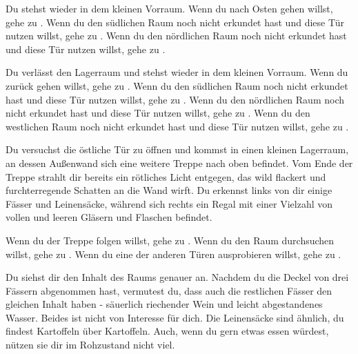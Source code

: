 
Du stehst wieder in dem kleinen Vorraum. Wenn du nach Osten gehen willst, gehe zu .
Wenn du den südlichen Raum noch nicht erkundet hast und diese Tür nutzen willst, gehe zu .
Wenn du den nördlichen Raum noch nicht erkundet hast und diese Tür nutzen willst, gehe zu .


Du verlässt den Lagerraum und stehst wieder in dem kleinen Vorraum. Wenn du zurück gehen willst, gehe zu .
Wenn du den südlichen Raum noch nicht erkundet hast und diese Tür nutzen willst, gehe zu .
Wenn du den nördlichen Raum noch nicht erkundet hast und diese Tür nutzen willst, gehe zu .
Wenn du den westlichen Raum noch nicht erkundet hast und diese Tür nutzen willst, gehe zu .




Du versuchst die östliche Tür zu öffnen und kommst in einen kleinen Lagerraum, an dessen Außenwand sich eine weitere Treppe nach oben befindet. Vom Ende der Treppe strahlt dir bereits ein rötliches Licht entgegen, das wild flackert und furchterregende Schatten an die Wand wirft.
Du erkennst links von dir einige Fässer und Leinensäcke, während sich rechts ein Regal mit einer Vielzahl von vollen und leeren Gläsern und Flaschen befindet.

Wenn du der Treppe folgen willst, gehe zu .
Wenn du den Raum durchsuchen willst, gehe zu .
Wenn du eine der anderen Türen ausprobieren willst, gehe zu .


Du siehst dir den Inhalt des Raums genauer an. Nachdem du die Deckel von drei Fässern abgenommen hast, vermutest du, dass auch die restlichen Fässer den gleichen Inhalt haben - säuerlich riechender Wein und leicht abgestandenes Wasser. Beides ist nicht von Interesse für dich. Die Leinensäcke sind ähnlich, du findest Kartoffeln über Kartoffeln. Auch, wenn du gern etwas essen würdest, nützen sie dir im Rohzustand nicht viel.

